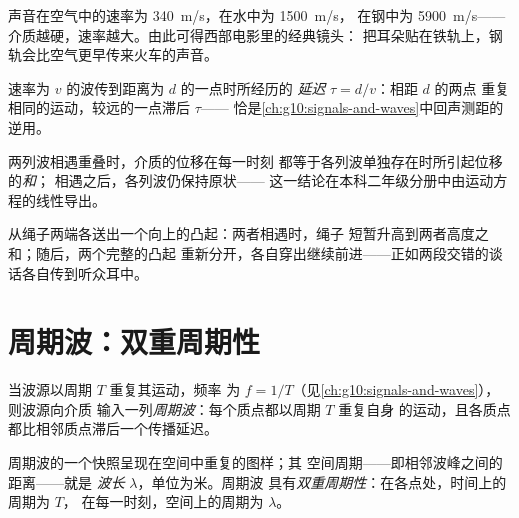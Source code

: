 \begin{example}[声音的速率]\label{ex:g12:mechanical-waves:speeds}
声音在空气中的速率为 \qty{340}{m/s}，在水中为 \qty{1500}{m/s}，
在钢中为 \qty{5900}{m/s}——介质越硬，速率越大。由此可得西部电影里的经典镜头：
把耳朵贴在铁轨上，钢轨会比空气更早传来火车的声音。
\end{example}

\begin{definition}[延迟]\label{def:g12:mechanical-waves:delay}
速率为 $v$ 的波传到距离为 $d$ 的一点时所经历的
\emph{延迟} $\tau = d/v$：相距 $d$ 的两点
重复相同的运动，较远的一点滞后 $\tau$——
恰是\cref{ch:g10:signals-and-waves}中回声测距的逆用。
\end{definition}

\begin{proposition}[无相互作用的叠加]\label{prop:g12:mechanical-waves:superposition}
两列波相遇重叠时，介质的位移在每一时刻
都等于各列波单独存在时所引起位移的\emph{和}；
相遇之后，各列波仍保持原状——
这一结论在本科二年级分册中由运动方程的线性导出。\admitted
\end{proposition}

\begin{example}[相遇的脉冲]\label{ex:g12:mechanical-waves:crossing}
从绳子两端各送出一个向上的凸起：两者相遇时，绳子
短暂升高到两者高度之和；随后，两个完整的凸起
重新分开，各自穿出继续前进——正如两段交错的谈话各自传到听众耳中。
\end{example}

\section{周期波：双重周期性}

\begin{definition}[周期波]\label{def:g12:mechanical-waves:periodic}
当波源以周期 $T$ 重复其运动，频率
为 $f = 1/T$（见\cref{ch:g10:signals-and-waves}），则波源向介质
输入一列\emph{周期波}：每个质点都以周期 $T$ 重复自身
的运动，且各质点都比相邻质点滞后一个传播延迟。
\end{definition}

\begin{definition}[波长]\label{def:g12:mechanical-waves:wavelength}
周期波的一个快照呈现在空间中重复的图样；其
空间周期——即相邻波峰之间的距离——就是
\emph{波长} $\lambda$，单位为米。周期波
具有\emph{双重周期性}：在各点处，时间上的周期为 $T$，
在每一时刻，空间上的周期为 $\lambda$。
\end{definition}

